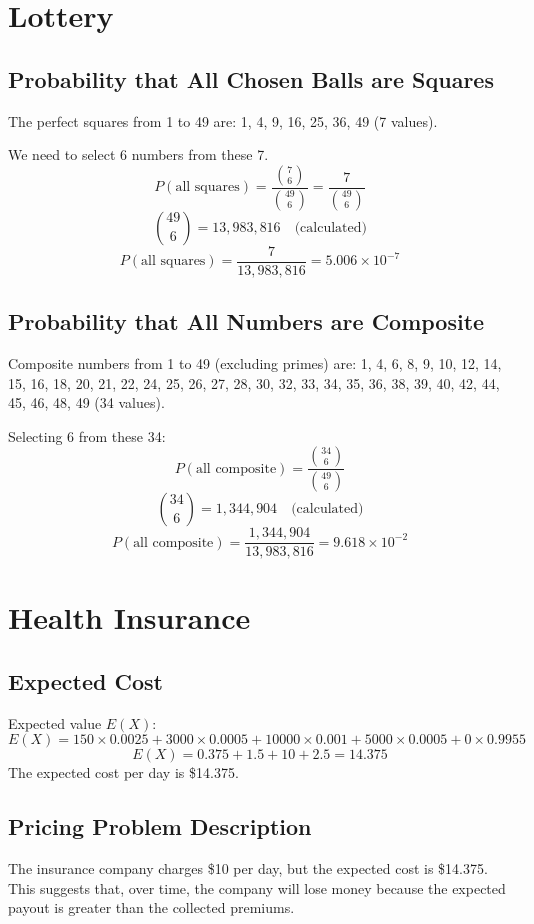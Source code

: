 \documentclass{article}
\begin{document}
\newpage

\section{Lottery}

\subsection{Probability that All Chosen Balls are Squares}
The perfect squares from 1 to 49 are: 1, 4, 9, 16, 25, 36, 49 (7 values).

We need to select 6 numbers from these 7.
\[
P(\text{all squares}) = \frac{\binom{7}{6}}{\binom{49}{6}} = \frac{7}{\binom{49}{6}}
\]
\[
\binom{49}{6} = 13,983,816 \quad \text{(calculated)}
\]
\[
P(\text{all squares}) = \frac{7}{13,983,816} = 5.006 \times 10^{-7}
\]

\subsection{Probability that All Numbers are Composite}
Composite numbers from 1 to 49 (excluding primes) are: 1, 4, 6, 8, 9, 10, 12, 14, 15, 16, 18, 20, 21, 22, 24, 25, 26, 27, 28, 30, 32, 33, 34, 35, 36, 38, 39, 40, 42, 44, 45, 46, 48, 49 (34 values).

Selecting 6 from these 34:
\[
P(\text{all composite}) = \frac{\binom{34}{6}}{\binom{49}{6}}
\]
\[
\binom{34}{6} = 1,344,904 \quad \text{(calculated)}
\]
\[
P(\text{all composite}) = \frac{1,344,904}{13,983,816} = 9.618 \times 10^{-2}
\]

\newpage

\section{Health Insurance}

\subsection{Expected Cost}
Expected value \( E(X) \):
\[
E(X) = 150 \times 0.0025 + 3000 \times 0.0005 + 10000 \times 0.001 + 5000 \times 0.0005 + 0 \times 0.9955
\]
\[
E(X) = 0.375 + 1.5 + 10 + 2.5 = 14.375
\]
The expected cost per day is \$14.375.

\subsection{Pricing Problem Description}
The insurance company charges \$10 per day, but the expected cost is \$14.375. This suggests that, over time, the company will lose money because the expected payout is greater than the collected premiums.
\end{document}
